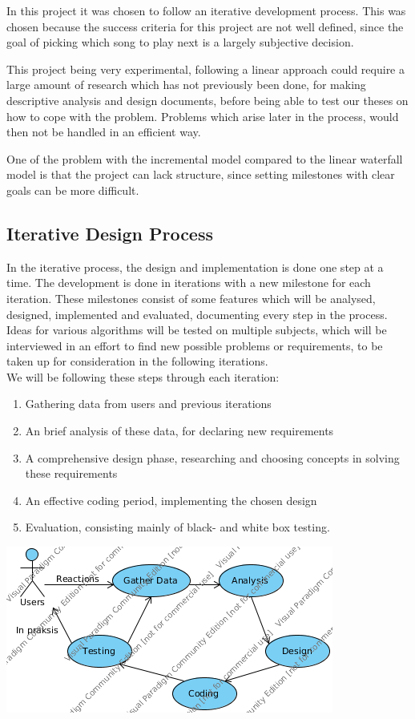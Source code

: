In this project it was chosen to follow an iterative development process. This was chosen because the success criteria for this project are not well defined, since the goal of picking which song to play next is a largely subjective decision.

This project being very experimental, following a linear approach could require a large amount of research which has not previously been done, for making descriptive analysis and design documents, before being able to test our theses on how to cope with the problem. Problems which arise later in the process, would then not be handled in an efficient way.

One of the problem with the incremental model compared to the linear waterfall model is that the project can lack structure, since setting milestones with clear goals can be more difficult.


\subsection{Iterative Design Process}
In the iterative process, the design and implementation is done one step at a time. The development is done in iterations with a new milestone for each iteration. These milestones consist of some features which will be analysed, designed, implemented and evaluated, documenting every step in the process. Ideas for various algorithms will be tested on multiple subjects, which will be interviewed in an effort to find new possible problems or requirements, to be taken up for consideration in the following iterations.\\
We will be following these steps through each iteration:

\begin{enumerate}
  \item Gathering data from users and previous iterations
  \item An brief analysis of these data, for declaring new requirements
  \item A comprehensive design phase, researching and choosing concepts in solving these requirements
  \item An effective coding period, implementing the chosen design
  \item Evaluation, consisting mainly of black- and white box testing.
\end{enumerate}

\includegraphics{Images/Developmentprocess.png}

